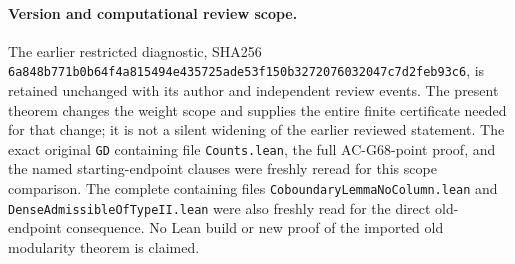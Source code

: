 \paragraph{Version and computational review scope.}
The earlier restricted diagnostic, SHA256
\texttt{6a848b771b0b64f4a815494e435725ade53f150b3272076032047c7d2feb93c6},
is retained unchanged with its author and independent review events.
The present theorem changes the weight scope and supplies the entire
finite certificate needed for that change; it is not a silent widening
of the earlier reviewed statement.  The exact original \texttt{GD}
containing file \texttt{Counts.lean}, the full AC-G68-point proof,
and the named starting-endpoint clauses were freshly reread for this
scope comparison.  The complete containing files
\texttt{CoboundaryLemmaNoColumn.lean} and
\texttt{DenseAdmissibleOfTypeII.lean} were also freshly read for
the direct old-endpoint consequence.  No Lean build or new proof of the imported old
modularity theorem is claimed.
